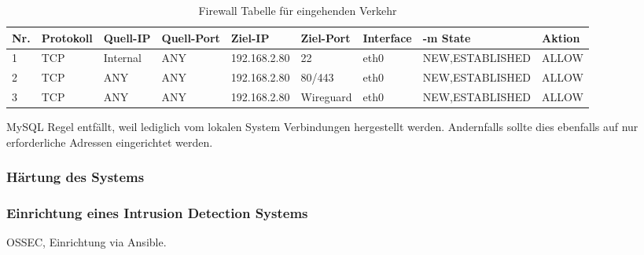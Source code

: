 \begin{table}[!ht]
    \centering
    \begin{adjustbox}{width=\textwidth}

    \begin{tabular}{|l|l|l|l|l|l|l|l|l|}
        \hline
            Nr. & Protokoll & Quell-IP & Quell-Port & Ziel-IP & Ziel-Port & Interface & -m State & Aktion \\ \hline
            1 & TCP & Internal & ANY & 192.168.2.80 & 22 & eth0 & NEW,ESTABLISHED & ALLOW \\ \hline
            2 & TCP & ANY & ANY & 192.168.2.80 & 80/443 & eth0 & NEW,ESTABLISHED & ALLOW \\ \hline
            3 & TCP & ANY & ANY & 192.168.2.80 & Wireguard & eth0 & NEW,ESTABLISHED & ALLOW \\ \hline
        \end{tabular}
    \end{adjustbox}
    \caption{Firewall Tabelle für eingehenden Verkehr}
    \label{regeln_fw_incoming}
\end{table}

MySQL Regel entfällt, weil lediglich vom lokalen System Verbindungen hergestellt werden. Andernfalls sollte dies ebenfalls auf nur erforderliche Adressen eingerichtet werden.

\subsubsection{Härtung des Systems}\label{kap:haertung_des_systems}


\subsubsection{Einrichtung eines Intrusion Detection Systems}

OSSEC, Einrichtung via Ansible.



